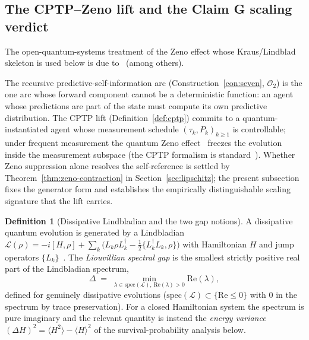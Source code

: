 \documentclass[11pt,a4paper]{article}
\theoremstyle{plain}
\theoremstyle{definition}
\newtheorem{definition}[theorem]{Definition}
\theoremstyle{remark}
\newcommand{\OO}{\mathcal{O}}
\begin{document}
\subsection{The CPTP--Zeno lift and the Claim G scaling verdict}
\label{sec:verdict-cptp}

The open-quantum-systems treatment of the Zeno effect whose
Kraus/Lindblad skeleton is used below is due
to~\citet{becker2021zeno} (among others).

The recursive predictive-self-information arc
(Construction~\ref{con:seven}, $\OO_2$) is the one arc whose
forward component cannot be a deterministic function: an agent
whose predictions are part of the state must compute its own
predictive distribution. The CPTP lift (Definition~\ref{def:cptp})
commits to a quantum-instantiated agent whose measurement schedule
$(\tau_k,P_k)_{k\geq1}$ is controllable; under frequent
measurement the quantum Zeno effect~\cite{misra1977,facchi2008}
freezes the evolution inside the measurement subspace (the CPTP
formalism is standard~\cite{nielsen2000}). Whether Zeno
suppression alone resolves the self-reference is settled by
Theorem~\ref{thm:zeno-contraction} in Section~\ref{sec:lipschitz};
the present subsection fixes the generator form and establishes
the empirically distinguishable scaling signature that the lift
carries.

\begin{definition}[Dissipative Lindbladian and the two gap notions]
\label{def:lindbladian}
A dissipative quantum evolution is generated by a Lindbladian
$\mathcal L(\rho)=-i[H,\rho]+\sum_k\bigl(L_k\rho L_k^\dagger-
\tfrac12\{L_k^\dagger L_k,\rho\}\bigr)$ with Hamiltonian $H$ and
jump operators $\{L_k\}$~\cite{nielsen2000}. The \emph{Liouvillian
spectral gap} is the smallest strictly positive real part of the
Lindbladian spectrum,
\begin{equation}\label{eq:liouvillian-gap}
  \Delta \;=\; \min_{\lambda\in\mathrm{spec}(\mathcal L),\,
  \mathrm{Re}(\lambda)>0}\mathrm{Re}(\lambda),
\end{equation}
defined for genuinely dissipative evolutions ($\mathrm{spec}
(\mathcal L)\subset\{\mathrm{Re}\leq0\}$ with $0$ in the spectrum
by trace preservation). For a closed Hamiltonian system the
spectrum is pure imaginary and the relevant quantity is instead
the \emph{energy variance}
$(\Delta H)^{2}=\langle H^{2}\rangle-\langle H\rangle^{2}$ of the
survival-probability analysis below.
\end{definition}
\end{document}
